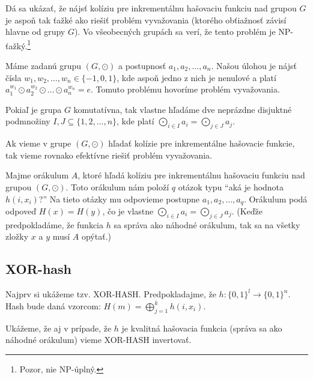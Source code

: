 Dá sa ukázať, že nájsť kolíziu pre inkrementálnu hašovaciu
funkciu nad grupou $G$ je aspoň tak ťažké ako riešiť
problém vyvažovania (ktorého obťiažnosť závisí hlavne od grupy 
$G$). Vo všeobecných grupách sa verí, že tento problém je
NP-ťažký.\footnote{Pozor, nie NP-úplný.}

\begin{definicia}
    Máme zadanú grupu $(G, \odot)$ a postupnosť $a_1, a_2, \dots, a_n$.
    Našou úlohou je nájsť čísla $w_1, w_2, \dots, w_n \in \{-1, 0, 1\}$,
    kde aspoň jedno z nich je nenulové a platí 
    $a_1^{w_1} \odot a_2^{w_2} \odot \dots \odot a_n^{w_n} = e$.
    Tomuto problému hovoríme problém vyvažovania.
\end{definicia}

\begin{poznamka}
    Pokiaľ je grupa $G$ komutatívna, tak vlastne hľadáme
    dve neprázdne disjuktné podmnožiny
    $I, J \subseteq \{1, 2, \dots, n\}$, kde platí 
    $\bigodot_{i\in I} a_i = \bigodot_{j \in J} a_j$.
\end{poznamka}

\begin{lema}
    Ak vieme v grupe $(G, \odot)$ hľadať kolízie pre inkrementálne hašovacie
    funkcie, tak vieme rovnako efektívne riešiť problém vyvažovania.
\end{lema}

\begin{dokaz}
    Majme orákulum $A$, ktoré hľadá kolíziu pre inkrementálnu hašovaciu
    funkciu nad grupou $(G, \odot)$. Toto orákulum nám položí $q$ otázok
    typu ``aká je hodnota $h(i, x_i)$?'' Na tieto otázky mu odpovieme postupne
    $a_1, a_2, \dots, a_q$.
    Orákulum podá odpoveď $H(x) = H(y)$, čo je vlastne 
    $\bigodot_{i \in I} a_i = \bigodot_{j \in J} a_j$.
    (Keďže predpokladáme, že funkcia $h$ sa správa ako náhodné orákulum,
    tak sa na všetky zložky $x$ a $y$ musí $A$ opýtať.)
\end{dokaz}

\subsection{XOR-hash}

Najprv si ukážeme tzv. XOR-HASH.
Predpokladajme, že $h\colon \{0,1\}^l \to \{0,1\}^n$.
Hash bude daná vzorcom:
$H(m) = \displaystyle\bigoplus_{j=1}^k h(i, x_i)$.

Ukážeme, že aj v prípade, že $h$ je kvalitná hašovacia funkcia
(správa sa ako náhodné orákulum) vieme XOR-HASH invertovať.


